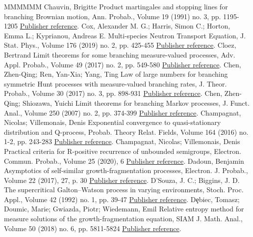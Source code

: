 \documentclass[11pt]{article}
\theoremstyle{definition}
\numberwithin{equation}{section}
\numberwithin{figure}{section}
\numberwithin{table}{section}
\begin{document}
\begin{thebibliography}{MMMMMM}
 Chauvin, Brigitte Product martingales and stopping lines for branching Brownian motion, Ann. Probab., Volume 19 (1991) no. 3, pp. 1195-1205 \href{https://ahl.centre-mersenne.org/item/AHL_2020__3__795_0/#Cha-stop}{Publisher reference}.
 Cox, Alexander M. G.; Harris, Simon C.; Horton, Emma L.; Kyprianou, Andreas E. Multi-species Neutron Transport Equation, J. Stat. Phys., Volume 176 (2019) no. 2, pp. 425-455 \href{https://ahl.centre-mersenne.org/item/AHL_2020__3__795_0/#CHHK}{Publisher reference}.
 Cloez, Bertrand Limit theorems for some branching measure-valued processes, Adv. Appl. Probab., Volume 49 (2017) no. 2, pp. 549-580 \href{https://ahl.centre-mersenne.org/item/AHL_2020__3__795_0/#Cloez}{Publisher reference}.
 Chen, Zhen-Qing; Ren, Yan-Xia; Yang, Ting Law of large numbers for branching symmetric Hunt processes with measure-valued branching rates, J. Theor. Probab., Volume 30 (2017) no. 3, pp. 898-931 \href{https://ahl.centre-mersenne.org/item/AHL_2020__3__795_0/#CRY}{Publisher reference}.
 Chen, Zhen-Qing; Shiozawa, Yuichi Limit theorems for branching Markov processes, J. Funct. Anal., Volume 250 (2007) no. 2, pp. 374-399 \href{https://ahl.centre-mersenne.org/item/AHL_2020__3__795_0/#ChYu}{Publisher reference}.
 Champagnat, Nicolas; Villemonais, Denis Exponential convergence to quasi-stationary distribution and Q-process, Probab. Theory Relat. Fields, Volume 164 (2016) no. 1-2, pp. 243-283 \href{https://ahl.centre-mersenne.org/item/AHL_2020__3__795_0/#ChVil}{Publisher reference}.
 Champagnat, Nicolas; Villemonais, Denis Practical criteria for R-positive recurrence of unbounded semigroups, Electron. Commun. Probab., Volume 25 (2020), 6 \href{https://ahl.centre-mersenne.org/item/AHL_2020__3__795_0/#CV-unbounded}{Publisher reference}.
 Dadoun, Benjamin Asymptotics of self-similar growth-fragmentation processes, Electron. J. Probab., Volume 22 (2017), 27, p. 30 \href{https://ahl.centre-mersenne.org/item/AHL_2020__3__795_0/#Dadoun}{Publisher reference}.
 D’Souza, J. C.; Biggins, J. D. The supercritical Galton–Watson process in varying environments, Stoch. Proc. Appl., Volume 42 (1992) no. 1, pp. 39-47 \href{https://ahl.centre-mersenne.org/item/AHL_2020__3__795_0/#DB-bpre}{Publisher reference}.
 D{ȩ}biec, Tomasz; Doumic, Marie; Gwiazda, Piotr; Wiedemann, Emil Relative entropy method for measure solutions of the growth-fragmentation equation, SIAM J. Math. Anal., Volume 50 (2018) no. 6, pp. 5811-5824 \href{https://ahl.centre-mersenne.org/item/AHL_2020__3__795_0/#DDGW}{Publisher reference}.

\end{thebibliography}
\end{document}
